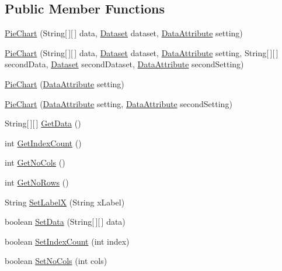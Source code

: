 \subsection*{Public Member Functions}
\begin{DoxyCompactItemize}
\item 
\hyperlink{class_pie_chart_a14e2a6c33b864d41debeb28df658286d}{Pie\-Chart} (String\mbox{[}$\,$\mbox{]}\mbox{[}$\,$\mbox{]} data, \hyperlink{class_dataset}{Dataset} dataset, \hyperlink{class_data_attribute}{Data\-Attribute} setting)
\item 
\hyperlink{class_pie_chart_aa7d3ab5c52b817c6731e1430831eaf39}{Pie\-Chart} (String\mbox{[}$\,$\mbox{]}\mbox{[}$\,$\mbox{]} data, \hyperlink{class_dataset}{Dataset} dataset, \hyperlink{class_data_attribute}{Data\-Attribute} setting, String\mbox{[}$\,$\mbox{]}\mbox{[}$\,$\mbox{]} second\-Data, \hyperlink{class_dataset}{Dataset} second\-Dataset, \hyperlink{class_data_attribute}{Data\-Attribute} second\-Setting)
\item 
\hyperlink{class_pie_chart_a122d771ebfd985bcb2b93e7f44719d0f}{Pie\-Chart} (\hyperlink{class_data_attribute}{Data\-Attribute} setting)
\item 
\hyperlink{class_pie_chart_aa2069046c7fa130fee473e17f57f570b}{Pie\-Chart} (\hyperlink{class_data_attribute}{Data\-Attribute} setting, \hyperlink{class_data_attribute}{Data\-Attribute} second\-Setting)
\item 
String\mbox{[}$\,$\mbox{]}\mbox{[}$\,$\mbox{]} \hyperlink{class_pie_chart_a7916d8aa39dbd1c48a1dac3cd3245f23}{Get\-Data} ()
\item 
int \hyperlink{class_pie_chart_a30b3ea3e7a0e5c53f50f3db916353346}{Get\-Index\-Count} ()
\item 
int \hyperlink{class_pie_chart_a3f104bd6d571abec5b8af8b43fdd96d7}{Get\-No\-Cols} ()
\item 
int \hyperlink{class_pie_chart_afbfbd6da7482a63d068c644e9e8cb149}{Get\-No\-Rows} ()
\item 
String \hyperlink{class_pie_chart_a2c5f499766ccbe0f5a537910a372fd6e}{Set\-Label\-X} (String x\-Label)
\item 
boolean \hyperlink{class_pie_chart_aeea92be8ab84aa78e56ec5c4f90e308b}{Set\-Data} (String\mbox{[}$\,$\mbox{]}\mbox{[}$\,$\mbox{]} data)
\item 
boolean \hyperlink{class_pie_chart_ad7812a5d88a05da851be00ac4728126c}{Set\-Index\-Count} (int index)
\item 
boolean \hyperlink{class_pie_chart_a0807bdf531833bcfa2ef97228ddfa770}{Set\-No\-Cols} (int cols)

\end{DoxyCompactItemize}
